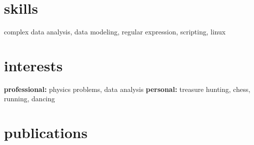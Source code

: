 \documentclass[]{friggeri-cv} %
\begin{document}
\section{skills}
complex data analysis, data modeling, regular expression, scripting, linux

\section{interests}

\textbf{professional:} physics problems, data analysis \textbf{personal:} treasure hunting, chess, running, dancing



\section{publications}
\nocite{*}



%
%
%

%
%
\end{document}
